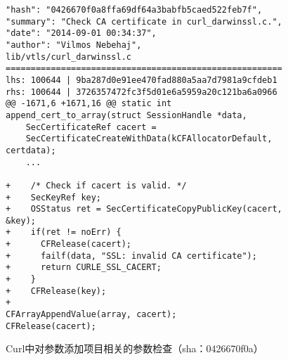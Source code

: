 \begin{figure}[b]
	\centering
\begin{lstlisting}
"hash": "0426670f0a8ffa69df64a3babfb5caed522feb7f",
"summary": "Check CA certificate in curl_darwinssl.c.",
"date": "2014-09-01 00:34:37",
"author": "Vilmos Nebehaj",
lib/vtls/curl_darwinssl.c
=======================================================
lhs: 100644 | 9ba287d0e91ee470fad880a5aa7d7981a9cfdeb1
rhs: 100644 | 3726357472fc3f5d01e6a5959a20c121ba6a0966
@@ -1671,6 +1671,16 @@ static int append_cert_to_array(struct SessionHandle *data,
	SecCertificateRef cacert =
	SecCertificateCreateWithData(kCFAllocatorDefault, certdata);
	...
	
+    /* Check if cacert is valid. */
+    SecKeyRef key;
+    OSStatus ret = SecCertificateCopyPublicKey(cacert, &key);
+    if(ret != noErr) {
+      CFRelease(cacert);
+      failf(data, "SSL: invalid CA certificate");
+      return CURLE_SSL_CACERT;
+    }
+    CFRelease(key);
+
CFArrayAppendValue(array, cacert);
CFRelease(cacert);

\end{lstlisting}
	\caption{
	Curl中对参数添加项目相关的参数检查（sha：0426670f0a）
	}
	\label{fig:2-3-fix}
\end{figure}